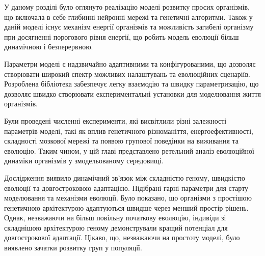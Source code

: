 \chapconclude{\ref{chap:practice}}




У даному розділі було оглянуто реалізацію моделі розвитку просих організмів,
що включала в себе глибинні нейронні мережі та генетичні алгоритми.
Також у даній моделі існує механізм енергії організмів та
можливість загибелі організму при досягненні 
порогового рівня енергії, що робить модель еволюції більш динамічною і безперервною.

Параметри моделі є надзвичайно адаптивними та конфігурованими, 
що дозволяє створювати широкий спектр можливих налаштувань 
та еволюційних сценаріїв. 
Розроблена бібліотека забезпечує легку взаємодію та швидку параметризацію, 
що дозволяє швидко створювати експериментальні установки 
для моделювання життя організмів.

Були проведені численні експерименти, які висвітлили різні залежності
параметрів моделі, такі як вплив генетичного різноманіття, 
енергоефективності, складності мозкової мережі та появою групової 
поведінки на виживання та еволюцію. 
Таким чином, у цій главі представлено ретельний аналіз еволюційної динаміки
організмів у змодельованому середовищі.

Дослідження виявило динамічний зв'язок між складністю геному, 
швидкістю еволюції та довгостроковою адаптацією. 
Підібрані гарні параметри для старту моделювання та механізми
еволюції.
Було показано, що організми з простішою генетичною архітектурою адаптуються
швидше через менший простір рішень. 
Однак, незважаючи на більш повільну початкову еволюцію, 
індивіди зі складнішою архітектурою геному демонстрували кращий потенціал 
для довгострокової адаптації.
Цікаво, що, незважаючи на простоту моделі, було виявлено
зачатки розвитку груп у популяції. 




